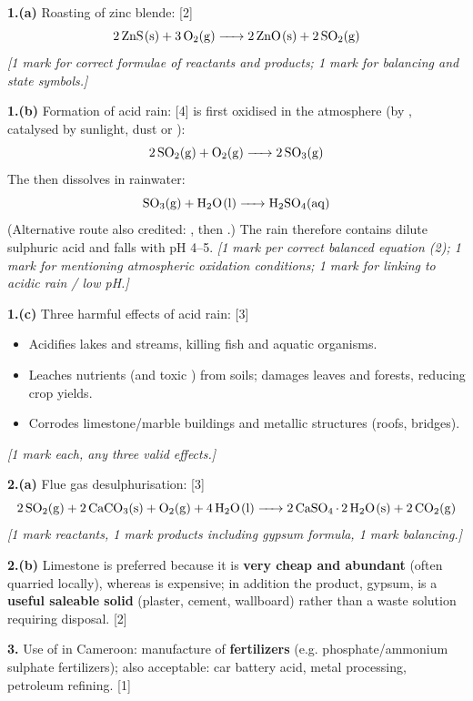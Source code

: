 \documentclass[11pt]{article}
\begin{document}
\begin{corrige}
\textbf{1.(a)} Roasting of zinc blende: \hfill [2]
\[ \ce{2ZnS(s) + 3O2(g) -> 2ZnO(s) + 2SO2(g)} \]
\emph{[1 mark for correct formulae of reactants and products; 1 mark for balancing and state symbols.]}

\textbf{1.(b)} Formation of acid rain: \hfill [4]
 is first oxidised in the atmosphere (by , catalysed by sunlight, dust or ):
\[ \ce{2SO2(g) + O2(g) -> 2SO3(g)} \]
The  then dissolves in rainwater:
\[ \ce{SO3(g) + H2O(l) -> H2SO4(aq)} \]
(Alternative route also credited: , then .) The rain therefore contains dilute sulphuric acid and falls with pH 4--5.
\emph{[1 mark per correct balanced equation (2); 1 mark for mentioning atmospheric oxidation conditions; 1 mark for linking to acidic rain / low pH.]}

\textbf{1.(c)} Three harmful effects of acid rain: \hfill [3]
\begin{itemize}
\item Acidifies lakes and streams, killing fish and aquatic organisms.
\item Leaches nutrients (and toxic ) from soils; damages leaves and forests, reducing crop yields.
\item Corrodes limestone/marble buildings and metallic structures (roofs, bridges).
\end{itemize}
\emph{[1 mark each, any three valid effects.]}

\textbf{2.(a)} Flue gas desulphurisation: \hfill [3]
\[ \ce{2SO2(g) + 2CaCO3(s) + O2(g) + 4H2O(l) -> 2CaSO4.2H2O(s) + 2CO2(g)} \]
\emph{[1 mark reactants, 1 mark products including gypsum formula, 1 mark balancing.]}

\textbf{2.(b)} Limestone is preferred because it is \textbf{very cheap and abundant} (often quarried locally), whereas  is expensive; in addition the product, gypsum, is a \textbf{useful saleable solid} (plaster, cement, wallboard) rather than a waste solution requiring disposal. \hfill [2]

\textbf{3.} Use of  in Cameroon: manufacture of \textbf{fertilizers} (e.g. phosphate/ammonium sulphate fertilizers); also acceptable: car battery acid, metal processing, petroleum refining. \hfill [1]
\end{corrige}
\end{document}
